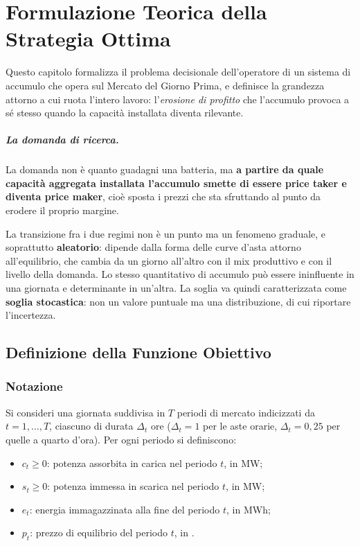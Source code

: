 \chapter{Formulazione Teorica della Strategia Ottima}
\label{cap:strategia}

Questo capitolo formalizza il problema decisionale dell'operatore di un sistema di accumulo
che opera sul Mercato del Giorno Prima, e definisce la grandezza attorno a cui ruota l'intero
lavoro: l'\emph{erosione di profitto} che l'accumulo provoca a s\'e stesso quando la
capacit\`a installata diventa rilevante.

\paragraph{La domanda di ricerca.}
\label{sec:domanda}
La domanda non \`e quanto guadagni una batteria, ma \textbf{a partire da quale capacit\`a
aggregata installata l'accumulo smette di essere price taker e diventa price maker}, cio\`e
sposta i prezzi che sta sfruttando al punto da erodere il proprio margine.

La transizione fra i due regimi non \`e un punto ma un fenomeno graduale, e soprattutto
\textbf{aleatorio}: dipende dalla forma delle curve d'asta attorno all'equilibrio, che cambia
da un giorno all'altro con il mix produttivo e con il livello della domanda. Lo stesso
quantitativo di accumulo pu\`o essere ininfluente in una giornata e determinante in un'altra.
La soglia va quindi caratterizzata come \textbf{soglia stocastica}: non un valore puntuale ma
una distribuzione, di cui riportare l'incertezza.

\section{Definizione della Funzione Obiettivo}
\label{sec:obiettivo}

\subsection*{Notazione}

Si consideri una giornata suddivisa in $T$ periodi di mercato indicizzati da
$t = 1, \dots, T$, ciascuno di durata $\Delta_t$ ore ($\Delta_t = 1$ per le aste orarie,
$\Delta_t = 0{,}25$ per quelle a quarto d'ora). Per ogni periodo si definiscono:

\begin{itemize}
  \item $c_t \ge 0$: potenza assorbita in carica nel periodo $t$, in MW;
  \item $s_t \ge 0$: potenza immessa in scarica nel periodo $t$, in MW;
  \item $e_t$: energia immagazzinata alla fine del periodo $t$, in MWh;
  \item $p_t$: prezzo di equilibrio del periodo $t$, in \euromwh{}.
\end{itemize}

